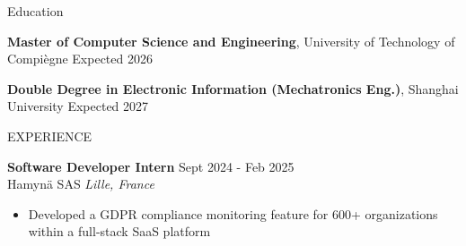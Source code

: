 \documentclass{resume} %
\begin{document}

\begin{rSection}{Education}

{\bf Master of Computer Science and Engineering}, University of Technology of Compiègne \hfill {Expected 2026}

{\bf Double Degree in Electronic Information (Mechatronics Eng.)}, Shanghai University \hfill {Expected 2027}

\end{rSection}





\begin{rSection}{EXPERIENCE}

\textbf{Software Developer Intern} \hfill Sept 2024 - Feb 2025\\
Hamynä SAS \hfill \textit{Lille, France}
 \begin{itemize}
    \itemsep -3pt {} 
     \item Developed a GDPR compliance monitoring feature for 600+ organizations within a full-stack SaaS platform
 \end{itemize}

\end{rSection} 

\end{document}
